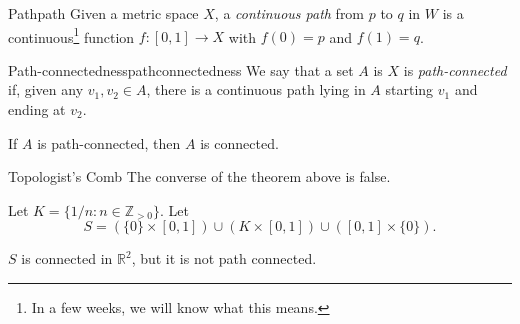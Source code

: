 \begin{defn}{Path}{path}
	Given a metric space \(X\), a \emph{continuous path} from \(p\) to \(q\) in \(W\) is a continuous\footnote{In a few weeks, we will know what this means.} function \(f\colon [0, 1] \to X\) with \(f(0) = p\) and \(f(1) = q\).
\end{defn}

\begin{defn}{Path-connectedness}{pathconnectedness}
	We say that a set \(A\) is \(X\) is \emph{path-connected} if, given any \(v_1, v_2 \in A\), there is a continuous path lying in \(A\) starting \(v_1\) and ending at \(v_2\).
\end{defn}

\begin{thm}{}{}
	If \(A\) is path-connected, then \(A\) is connected.
\end{thm}

\begin{exmp}{Topologist's Comb}{}
	The converse of the theorem above is false. 

	Let \(K = \{1/n : n \in \mathbb{Z}_{>0}\}\). Let 
	\[ S = (\{0\} \times [0,1] ) \cup (K \times [0,1]) \cup ([0,1] \times \{0\}). \]

	\(S\) is connected in \(\mathbb{R}^2\), but it is not path connected.
\end{exmp}
